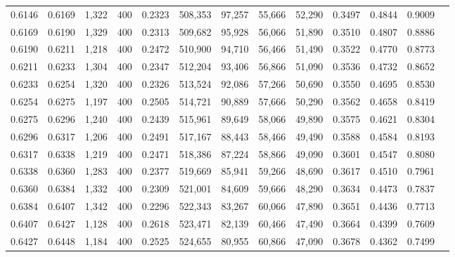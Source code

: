 \begin{tabular}{rrrrrrrrrrrrr}
0.6146 & 0.6169 &  1,322 & 400 &                                     0.2323 & 508,353 &  97,257 &  55,666 &  52,290 & 0.3497 & 0.4844 & 0.9009 \\
0.6169 & 0.6190 &  1,329 & 400 &                                     0.2313 & 509,682 &  95,928 &  56,066 &  51,890 & 0.3510 & 0.4807 & 0.8886 \\
0.6190 & 0.6211 &  1,218 & 400 &                                     0.2472 & 510,900 &  94,710 &  56,466 &  51,490 & 0.3522 & 0.4770 & 0.8773 \\
0.6211 & 0.6233 &  1,304 & 400 &                                     0.2347 & 512,204 &  93,406 &  56,866 &  51,090 & 0.3536 & 0.4732 & 0.8652 \\
0.6233 & 0.6254 &  1,320 & 400 &                                     0.2326 & 513,524 &  92,086 &  57,266 &  50,690 & 0.3550 & 0.4695 & 0.8530 \\
0.6254 & 0.6275 &  1,197 & 400 &                                     0.2505 & 514,721 &  90,889 &  57,666 &  50,290 & 0.3562 & 0.4658 & 0.8419 \\
0.6275 & 0.6296 &  1,240 & 400 &                                     0.2439 & 515,961 &  89,649 &  58,066 &  49,890 & 0.3575 & 0.4621 & 0.8304 \\
0.6296 & 0.6317 &  1,206 & 400 &                                     0.2491 & 517,167 &  88,443 &  58,466 &  49,490 & 0.3588 & 0.4584 & 0.8193 \\
0.6317 & 0.6338 &  1,219 & 400 &                                     0.2471 & 518,386 &  87,224 &  58,866 &  49,090 & 0.3601 & 0.4547 & 0.8080 \\
0.6338 & 0.6360 &  1,283 & 400 &                                     0.2377 & 519,669 &  85,941 &  59,266 &  48,690 & 0.3617 & 0.4510 & 0.7961 \\
0.6360 & 0.6384 &  1,332 & 400 &                                     0.2309 & 521,001 &  84,609 &  59,666 &  48,290 & 0.3634 & 0.4473 & 0.7837 \\
0.6384 & 0.6407 &  1,342 & 400 &                                     0.2296 & 522,343 &  83,267 &  60,066 &  47,890 & 0.3651 & 0.4436 & 0.7713 \\
0.6407 & 0.6427 &  1,128 & 400 &                                     0.2618 & 523,471 &  82,139 &  60,466 &  47,490 & 0.3664 & 0.4399 & 0.7609 \\
0.6427 & 0.6448 &  1,184 & 400 &                                     0.2525 & 524,655 &  80,955 &  60,866 &  47,090 & 0.3678 & 0.4362 & 0.7499 \\

\end{tabular}
